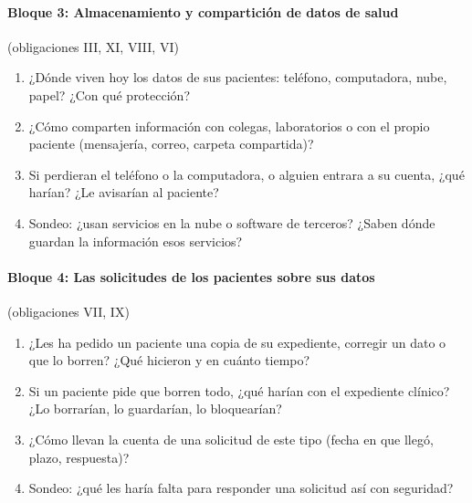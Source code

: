\documentclass[12pt, a4paper]{article}
\begin{document}
\paragraph{Bloque 3: Almacenamiento y compartición de datos de salud} (obligaciones III, XI, VIII, VI)
\begin{enumerate}
  \item ¿Dónde viven hoy los datos de sus pacientes: teléfono, computadora, nube, papel? ¿Con qué protección?
  \item ¿Cómo comparten información con colegas, laboratorios o con el propio paciente (mensajería, correo, carpeta compartida)?
  \item Si perdieran el teléfono o la computadora, o alguien entrara a su cuenta, ¿qué harían? ¿Le avisarían al paciente?
  \item Sondeo: ¿usan servicios en la nube o software de terceros? ¿Saben dónde guardan la información esos servicios?
\end{enumerate}
 
\paragraph{Bloque 4: Las solicitudes de los pacientes sobre sus datos} (obligaciones VII, IX)
\begin{enumerate}
  \item ¿Les ha pedido un paciente una copia de su expediente, corregir un dato o que lo borren? ¿Qué hicieron y en cuánto tiempo?
  \item Si un paciente pide que borren todo, ¿qué harían con el expediente clínico? ¿Lo borrarían, lo guardarían, lo bloquearían?
  \item ¿Cómo llevan la cuenta de una solicitud de este tipo (fecha en que llegó, plazo, respuesta)?
  \item Sondeo: ¿qué les haría falta para responder una solicitud así con seguridad?
\end{enumerate}
 
\end{document}
